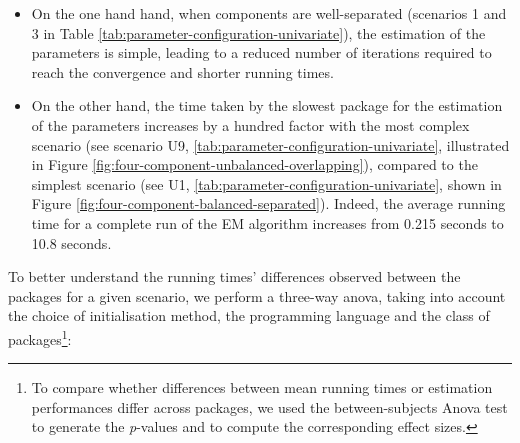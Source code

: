 \begin{itemize}
\item
  On the one hand hand, when components are well-separated (scenarios 1 and 3 in Table \ref{tab:parameter-configuration-univariate}), the estimation of
  the parameters is simple, leading to a reduced number of iterations
  required to reach the convergence and shorter running times.
\item
  On the other hand, the time taken by the slowest package for the estimation of the parameters increases by a hundred factor with the most
  complex scenario (see scenario U9, \ref{tab:parameter-configuration-univariate}, illustrated in Figure
  \ref{fig:four-component-unbalanced-overlapping}), compared to the simplest scenario (see U1, \ref{tab:parameter-configuration-univariate}, shown in Figure \ref{fig:four-component-balanced-separated}). Indeed, the average running time for a complete run of the EM algorithm increases from 0.215 seconds to 10.8 seconds.
\end{itemize}

To better understand the running times' differences observed between the
packages for a given scenario, we perform a three-way anova, taking into
account the choice of initialisation method, the programming language
and the class of packages\footnote{To compare
  whether differences between mean running times or estimation
  performances differ across packages, we used the between-subjects Anova test  to generate
  the \emph{p}-values and  to compute the corresponding effect sizes.}:

